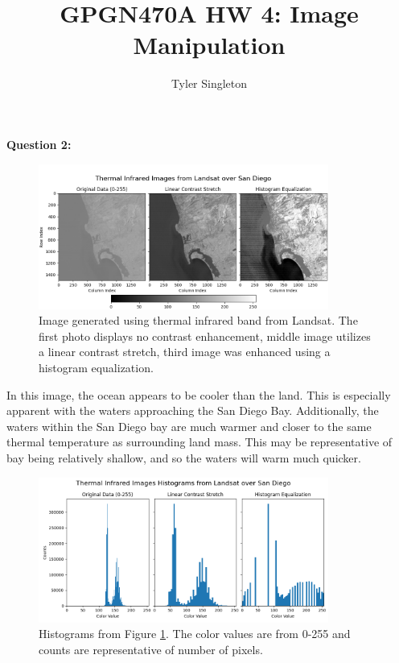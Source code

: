 \documentclass{homework}
\title{GPGN470A HW 4: Image Manipulation}
\author{Tyler Singleton}
\begin{document}
\maketitle

\textbf{Question 2:} \\

\begin{figure}[H]
    \centering
    \includegraphics[width=0.85\textwidth]{images/Enhanced_Images.png}
    \caption{Image generated using thermal infrared band from Landsat. The first photo displays no contrast enhancement, middle image utilizes a linear contrast stretch, third image was enhanced using a histogram equalization.}
    \label{fig:Enhanced_Images}
\end{figure}

In this image, the ocean appears to be cooler than the land. This is especially apparent with the waters approaching the San Diego Bay. Additionally, the waters within the San Diego bay are much warmer and closer to the same thermal temperature as surrounding land mass. This may be representative of bay being relatively shallow, and so the waters will warm much quicker. 

\begin{figure}[H]
    \centering
    \includegraphics[width=0.85\textwidth]{images/Enhanced_Image_Histograms.png}
    \caption{Histograms from Figure \ref{fig:Enhanced_Images}. The color values are from 0-255 and counts are representative of number of pixels.}
    \label{fig:Enhanced_Histograms}
\end{figure}
\end{document}
